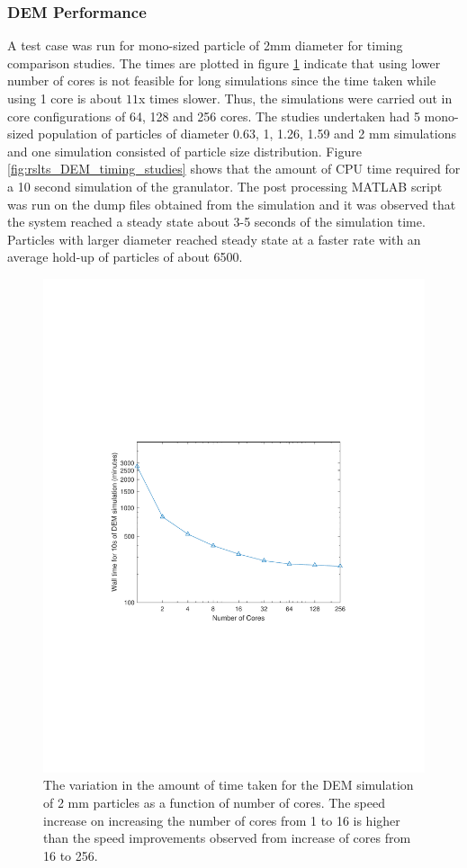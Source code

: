 \documentclass[preprint,11pt,authoryear]{elsarticle}
\begin{document}
\subsubsection{DEM Performance}
A test case was run for mono-sized particle of 2mm diameter for timing comparison studies. The 
times are plotted in figure \ref{fig:rslts_DEM_2mm_timing} indicate that using lower number of cores is 
not feasible for long simulations since the time taken while using 1 core is about $11$x times slower.
Thus, the simulations were carried out in core configurations of 64, 128 and 256 cores. The studies 
undertaken had 5 mono-sized population of particles of diameter 0.63, 1, 1.26, 1.59 and 2 mm 
simulations and one simulation consisted of particle size distribution. Figure 
\ref{fig:rslts_DEM_timing_studies} shows that the amount of CPU time required for a 10 second 
simulation of the granulator. The post processing MATLAB script was run on the dump files obtained 
from the simulation and it was observed that the system reached a steady state about 3-5 seconds of 
the simulation time. Particles with larger diameter reached steady state at a faster rate with an average 
hold-up of particles of about 6500. 
\begin{figure}[H]
\centering
\includegraphics[scale=0.75]{rslsts_2mm_timing_mtlb.pdf}
\caption{The variation in the amount of time taken for the DEM simulation of 2 mm particles as a function of number of cores. The 
speed increase on increasing the number of cores from 1 to 16 is higher than the speed improvements observed from increase of cores 
from 16 to 256.}
\label{fig:rslts_DEM_2mm_timing}
\end{figure}	
\end{document}
